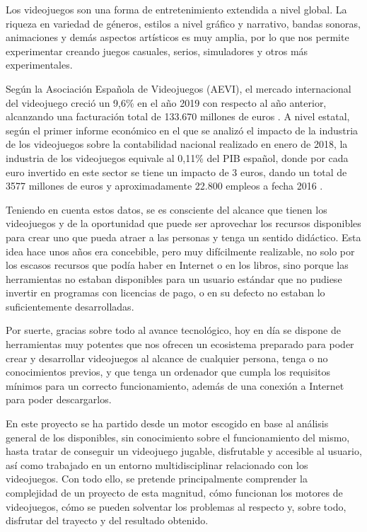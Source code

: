 Los videojuegos son una forma de entretenimiento extendida a nivel global. La riqueza en variedad de géneros, estilos a nivel gráfico y narrativo, bandas sonoras, animaciones y demás aspectos artísticos es muy amplia, por lo que nos permite experimentar creando juegos casuales, serios, simuladores y otros más experimentales.

Según la Asociación Española de Videojuegos (AEVI), el mercado internacional del videojuego creció un 9,6\% en el año 2019 con respecto al año anterior, alcanzando una facturación total de 133.670 millones de euros \cite{aevi:internacional}. A nivel estatal, según el primer informe económico en el que se analizó el impacto de la industria de los videojuegos sobre la contabilidad nacional realizado en enero de 2018, la industria de los videojuegos equivale al 0,11\% del PIB español, donde por cada euro invertido en este sector se tiene un impacto de 3 euros, dando un total de 3577 millones de euros y aproximadamente 22.800 empleos a fecha 2016 \cite{aevi:nacional}. 

Teniendo en cuenta estos datos, se es consciente del alcance que tienen los videojuegos y de la oportunidad que puede ser aprovechar los recursos disponibles para crear uno que pueda atraer a las personas y tenga un sentido didáctico. Esta idea hace unos años era concebible, pero muy difícilmente realizable, no solo por los escasos recursos que podía haber en Internet o en los libros, sino porque las herramientas no estaban disponibles para un usuario estándar que no pudiese invertir en programas con licencias de pago, o en su defecto no estaban lo suficientemente desarrolladas.

Por suerte, gracias sobre todo al avance tecnológico, hoy en día se dispone de herramientas muy potentes que nos ofrecen un ecosistema preparado para poder crear y desarrollar videojuegos al alcance de cualquier persona, tenga o no conocimientos previos, y que tenga un ordenador que cumpla los requisitos mínimos para un correcto funcionamiento, además de una conexión a Internet para poder descargarlos.

En este proyecto se ha partido desde un motor escogido en base al análisis general de los disponibles, sin conocimiento sobre el funcionamiento del mismo, hasta tratar de conseguir un videojuego jugable, disfrutable y accesible al usuario, así como trabajado en un entorno multidisciplinar relacionado con los videojuegos. Con todo ello, se pretende principalmente comprender la complejidad de un proyecto de esta magnitud, cómo funcionan los motores de videojuegos, cómo se pueden solventar los problemas al respecto y, sobre todo, disfrutar del trayecto y del resultado obtenido.

